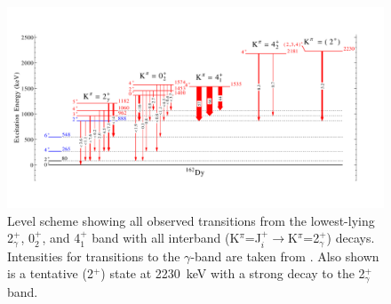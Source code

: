 \begin{landscape}
\begin{figure}[t]
\begin{center}
\includegraphics[height=0.85\textheight]{figures/162Dy_multiphonon042.pdf}
\caption{Level scheme showing all observed transitions from the lowest-lying 2$^+_\gamma$, 0$^+_2$, and 4$^+_1$ band with all interband (K$^\pi$=J$^+_i\rightarrow$K$^\pi$=2$^+_\gamma$) decays. Intensities for transitions to the $\gamma$-band are taken from \cite{Aprahamian200642}. Also shown is a tentative (2$^+$) state at 2230~keV with a strong decay to the 2$^+_\gamma$ band.
\label{fig:162Dy_multiphonon_042}}
\end{center}
\end{figure}
\end{landscape}

